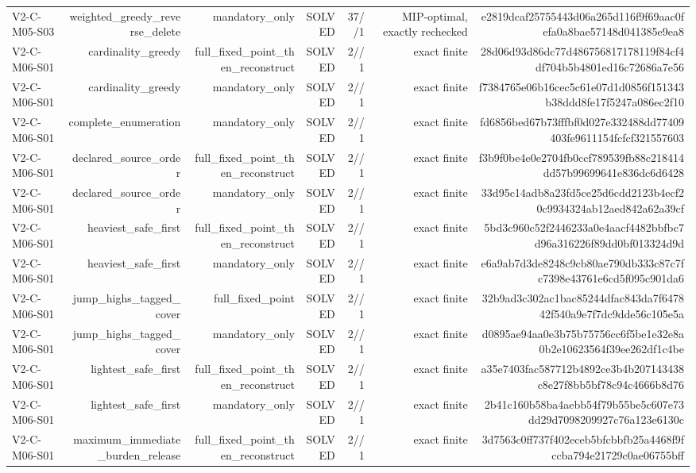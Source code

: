 {\begin{longtable}{lrrrrrr}
V2-C-M05-S03 & weighted\_greedy\_reverse\_delete & mandatory\_only & SOLVED & 37//1 & MIP-optimal, exactly rechecked & e2819dcaf25755443d06a265d116f9f69aac0fefa0a8bae57148d041385e9ea8 \\
V2-C-M06-S01 & cardinality\_greedy & full\_fixed\_point\_then\_reconstruct & SOLVED & 2//1 & exact finite & 28d06d93d86dc77d486756817178119f84cf4df704b5b4801ed16c72686a7e56 \\
V2-C-M06-S01 & cardinality\_greedy & mandatory\_only & SOLVED & 2//1 & exact finite & f7384765e06b16cec5c61e07d1d0856f151343b38ddd8fe17f5247a086ec2f10 \\
V2-C-M06-S01 & complete\_enumeration & mandatory\_only & SOLVED & 2//1 & exact finite & fd6856bed67b73fffbf0d027e332488dd77409403fe9611154fcfcf321557603 \\
V2-C-M06-S01 & declared\_source\_order & full\_fixed\_point\_then\_reconstruct & SOLVED & 2//1 & exact finite & f3b9f0be4e0e2704fb0ccf789539fb88c218414dd57b99699641e836dc6d6428 \\
V2-C-M06-S01 & declared\_source\_order & mandatory\_only & SOLVED & 2//1 & exact finite & 33d95c14adb8a23fd5ce25d6cdd2123b4ecf20c9934324ab12aed842a62a39cf \\
V2-C-M06-S01 & heaviest\_safe\_first & full\_fixed\_point\_then\_reconstruct & SOLVED & 2//1 & exact finite & 5bd3c960c52f2446233a0e4aacf4482bbfbc7d96a316226f89dd0bf013324d9d \\
V2-C-M06-S01 & heaviest\_safe\_first & mandatory\_only & SOLVED & 2//1 & exact finite & e6a9ab7d3de8248c9cb80ae790db333c87c7fc7398e43761e6cd5f095c901da6 \\
V2-C-M06-S01 & jump\_highs\_tagged\_cover & full\_fixed\_point & SOLVED & 2//1 & exact finite & 32b9ad3c302ac1bac85244dfac843da7f647842f540a9e7f7dc9dde56c105e5a \\
V2-C-M06-S01 & jump\_highs\_tagged\_cover & mandatory\_only & SOLVED & 2//1 & exact finite & d0895ae94aa0e3b75b75756cc6f5be1e32e8a0b2e10623564f39ee262df1c4be \\
V2-C-M06-S01 & lightest\_safe\_first & full\_fixed\_point\_then\_reconstruct & SOLVED & 2//1 & exact finite & a35e7403fac587712b4892ce3b4b207143438c8e27f8bb5bf78c94c4666b8d76 \\
V2-C-M06-S01 & lightest\_safe\_first & mandatory\_only & SOLVED & 2//1 & exact finite & 2b41c160b58ba4aebb54f79b55be5c607e73dd29d7098209927c76a123e6130c \\
V2-C-M06-S01 & maximum\_immediate\_burden\_release & full\_fixed\_point\_then\_reconstruct & SOLVED & 2//1 & exact finite & 3d7563c0ff737f402eceb5bfcbbfb25a4468f9fccba794e21729c0ae06755bff \\

\end{longtable}}
